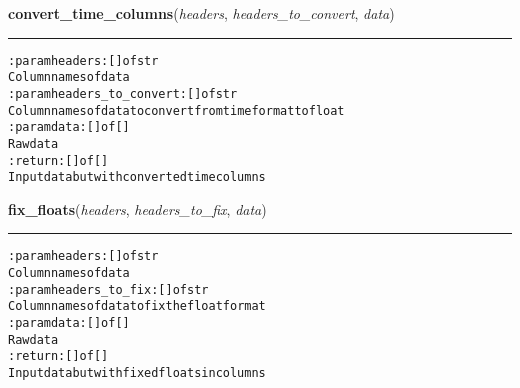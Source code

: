     \vspace{0.5ex}

\hspace{.8\funcindent}\begin{boxedminipage}{\funcwidth}

    \raggedright \textbf{convert\_time\_columns}(\textit{headers}, \textit{headers\_to\_convert}, \textit{data})

    \vspace{-1.5ex}

    \rule{\textwidth}{0.5\fboxrule}
\setlength{\parskip}{2ex}
\begin{alltt}

:param headers: [] of str
    Column names of data
:param headers\_to\_convert: [] of str
    Column names of data to convert from time format to float
:param data: [] of []
    Raw data
:return: [] of []
    Input data but with converted time columns
\end{alltt}

\setlength{\parskip}{1ex}
    \end{boxedminipage}

    \label{pygce:analysis:models:GarminDataFilter:fix_floats}

    \vspace{0.5ex}

\hspace{.8\funcindent}\begin{boxedminipage}{\funcwidth}

    \raggedright \textbf{fix\_floats}(\textit{headers}, \textit{headers\_to\_fix}, \textit{data})

    \vspace{-1.5ex}

    \rule{\textwidth}{0.5\fboxrule}
\setlength{\parskip}{2ex}
\begin{alltt}

:param headers: [] of str
    Column names of data
:param headers\_to\_fix: [] of str
    Column names of data to fix the float format
:param data: [] of []
    Raw data
:return: [] of []
    Input data but with fixed floats in columns
\end{alltt}

\setlength{\parskip}{1ex}
    \end{boxedminipage}


